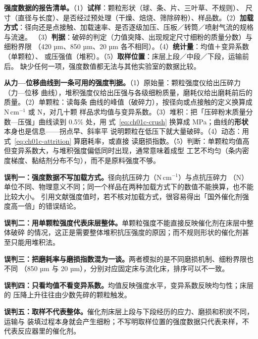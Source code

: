 \begin{measure}
\textbf{强度数据的报告清单。}（1）\textbf{试样}：颗粒形状（球、条、片、三叶草、不规则）、
尺寸（直径与长度）、是否经过预处理（干燥、焙烧、筛除碎粉）、样品数。（2）\textbf{加载
方式}：径向还是点接触、加载速率、是否逐级加压、压板／转筒／喷射气流的规格与流速。
（3）\textbf{判据}：破碎的判定（力值突降、出现规定尺寸细粉的质量分数）与细粉界限
（420 µm、850 µm、20 µm 各不相同）。（4）\textbf{统计量}：均值＋变异系数（单颗粒）、
或压强值（堆积）。（5）\textbf{取样位置}：床层上段／中段／下段，运输前后。
缺少任何一项，强度数值都无法与其他实验室的数据比较。
\end{measure}

\begin{dataflow}
\textbf{从力—位移曲线到一条可用的强度判据。}（1）原始量：颗粒强度仪给出压碎力（力—位移
曲线），堆积强度仪给出压强与各级细粉质量，磨耗仪给出磨耗前后的质量。（2）单颗粒：读每条
曲线的峰值（破碎力），按径向或点接触的定义换算成 $\mathrm{N\,cm^{-1}}$ 或 N，对几十颗
样品求均值与变异系数。（3）堆积：把「压碎粉末质量分数—压强」曲线读到 0.5\% 处，用
式~\eqref{eq:ch01c-crush} 换算成 MPa；曲线的\textbf{形状}本身也是信息——拐点早、斜率平
说明颗粒在低压下就大量破碎。（4）动态：用式~\eqref{eq:ch01c-attrition} 算磨耗率，或直接
读磨损指数。（5）判断：单颗粒均值高但变异系数大，与堆积强度偏低同时出现，通常意味着成型
工艺不均匀（条内密度梯度、黏结剂分布不匀），而不是原料强度不够。
\end{dataflow}

\begin{pitfall}
\textbf{误判一：强度数据不写加载方式。}径向抗压碎力（$\mathrm{N\,cm^{-1}}$）与点抗压碎力
（N）单位不同、物理意义不同；同一个样品在两种加载方式下的数值不能换算，也不能比较大小。
引用文献强度值时，若不核对加载方式，很容易得出「国外催化剂强度高一倍」的错误结论。

\textbf{误判二：用单颗粒强度代表床层整体。}单颗粒强度不能直接反映催化剂在床层中整体破碎
的情况，这正是需要整体堆积抗压强度的原因；而不规则形状的催化剂甚至只能用堆积法。

\textbf{误判三：把磨耗率与磨损指数混为一谈。}两者模拟的是不同磨损机制、细粉界限也不同
（850 µm 与 20 µm），分别对应固定床与流化床，排序可以不一致。

\textbf{误判四：只看均值不看变异系数。}均值反映强度水平，变异系数反映均匀性；床层的
压降上升往往由少数先碎的颗粒触发。

\textbf{误判五：取样不代表整体。}催化剂床层上段与下段经历的应力、磨损和积炭不同，运输与
装填过程本身就会产生细粉；不写明取样位置的强度数据只代表来样，不代表反应器里的催化剂。
\end{pitfall}

